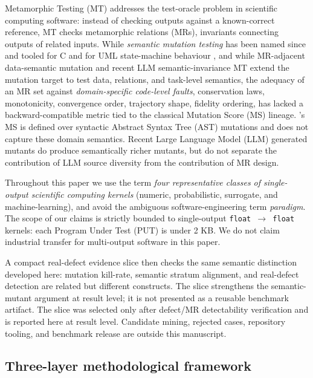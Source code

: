 \documentclass[acmsmall,screen,review]{acmart}
\begin{document}
Metamorphic Testing (MT) addresses the test-oracle problem in scientific
computing software: instead of checking outputs against a known-correct
reference, MT checks metamorphic relations (MRs), invariants connecting
outputs of related inputs. While \emph{semantic mutation testing} has
been named since \citet{7a6c280d9584691800e71876c716ea229335abeb} and tooled for C \citep{dan2012smtc}
and for UML state-machine behaviour \citep{derezinska2019uml}, and while
MR-adjacent data-semantic mutation \citep{sun2016mumt,sun2024datamutation,zhu2020datamorphic,chan2024metamorphic}
and recent LLM semantic-invariance MT \citep{0fa97cc4e2a0ffb6a777669b1b541c0372fac0d2} extend the mutation target
to test data, relations, and task-level semantics, the adequacy of an MR
set against \emph{domain-specific code-level faults}, conservation laws,
monotonicity, convergence order, trajectory shape, fidelity ordering,
has lacked a backward-compatible metric tied to the classical Mutation
Score (MS) lineage. \citeauthor{d7c38286734419b52de4262c9802ebdfcf4b9447}'s \citeyearpar{d7c38286734419b52de4262c9802ebdfcf4b9447} MS is defined over syntactic
Abstract Syntax Tree (AST) mutations and does not capture these domain
semantics. Recent Large Language Model (LLM) generated mutants \citep{tip2025llmorpheus,humbatova2021deepcrime} do
produce semantically richer mutants, but do not separate the
contribution of LLM source diversity from the contribution of MR design.

Throughout this paper we use the term \emph{four representative classes
of single-output scientific computing kernels} (numeric, probabilistic,
surrogate, and machine-learning), and avoid the ambiguous
software-engineering term \emph{paradigm}. The scope of our claims is
strictly bounded to single-output \texttt{float\ $\to$\ float} kernels: each
Program Under Test (PUT) is under 2 KB. We do not claim industrial transfer
for multi-output software in this paper.

A compact real-defect evidence slice then checks the same semantic
distinction developed here: mutation kill-rate, semantic stratum
alignment, and real-defect detection are related but different
constructs. The slice strengthens the semantic-mutant argument at result
level; it is not presented as a reusable benchmark artifact. The slice was
selected only after defect/MR detectability verification and is reported
here at result level. Candidate mining, rejected cases, repository
tooling, and benchmark release are outside this manuscript.

\subsection{Three-layer methodological framework}\label{three-layer-methodological-framework}
\end{document}
